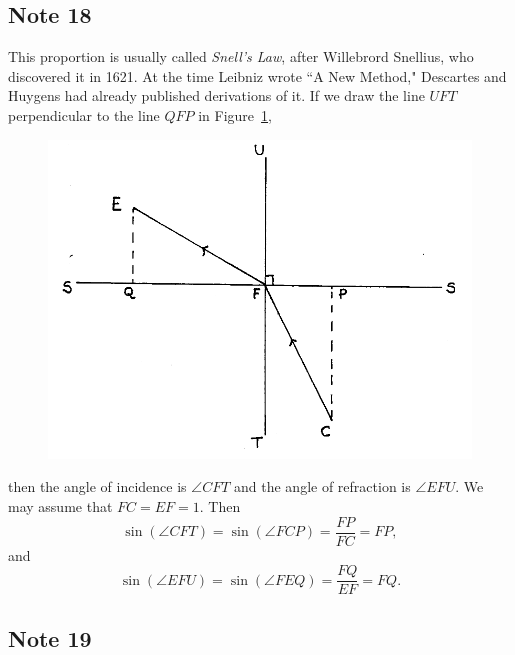 \documentclass[twoside,openright]{article}
\begin{document}
\subsection*{Note 18}
\label{cnm18}
This proportion is usually called {\em Snell's Law}, after Willebrord
Snellius, who discovered it in 1621.  At the time Leibniz wrote ``A
New Method," Descartes and Huygens had already published derivations
of it.  If we draw the line $UFT$ perpendicular to the line $QFP$ in
Figure~\ref{Snell},
\begin{figure}[htp]
\begin{center}
\includegraphics[width=.85\textwidth]{fig/Figure23}
\caption{}
\label{Snell}
\vspace{-10pt}
\end{center}
\end{figure}
 then the angle of incidence is $\angle CFT$ and the angle of refraction is $\angle EFU$.  We may assume that $FC = EF = 1$.  Then
$$\sin(\angle CFT) =  \sin(\angle FCP) = \frac{FP}{FC}= FP,$$
and
$$\sin(\angle EFU) =  \sin(\angle FEQ) = \frac{FQ}{EF} = FQ.$$

\subsection*{Note 19}
\label{cnm19}
\end{document}
